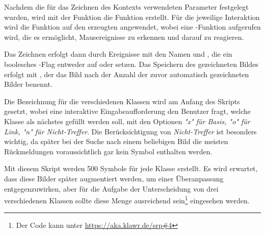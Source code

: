 Nachdem die für das Zeichnen des Kontexts verwendeten Parameter festgelegt wurden, wird mit der Funktion   die Funktion  erstellt.
Für die jeweilige Interaktion wird die Funktion  auf den erzeugten  angewendet, wobei eine -Funktion aufgerufen wird, die es ermöglicht, Mausereignisse zu erkennen und darauf zu reagieren.

Das Zeichnen erfolgt dann durch Ereignisse mit den Namen  und , die ein boolesches -Flag entweder auf  oder  setzen.
Das Speichern des gezeichneten Bildes erfolgt mit , der das Bild nach der Anzahl der zuvor automatisch gezeichneten Bilder benennt.

Die Bezeichnung für die verschiedenen Klassen wird am Anfang des Skripts gesetzt, wobei eine interaktive Eingabeaufforderung den Benutzer fragt, welche Klasse als nächstes gefüllt werden soll, mit den Optionen \textit{"x" für Basis, "o" für Link, "n" für Nicht-Treffer}.
Die Berücksichtigung von \textit{Nicht-Treffer} ist besonders wichtig, da später bei der Suche nach einem beliebigen Bild die meisten Rückmeldungen voraussichtlich gar kein Symbol enthalten werden.

Mit diesem Skript werden 500 Symbole für jede Klasse erstellt.
Es wird erwartet, dass diese Bilder später augmentiert werden, um einer Überanpassung entgegenzuwirken, aber für die Aufgabe der Unterscheidung von drei verschiedenen Klassen sollte diese Menge ausreichend sein\footnote{Der Code kann unter \url{https://aka.klawr.de/srp\#4}} eingesehen werden.

